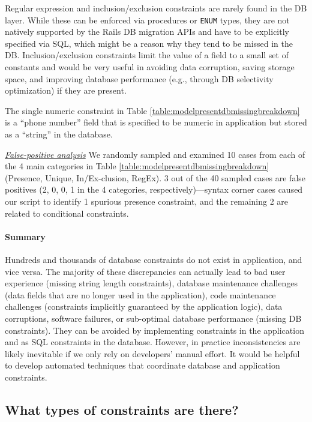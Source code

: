 Regular expression and inclusion/exclusion constraints are rarely found in the DB layer. While these can be enforced via procedures or {\tt ENUM} types, they are not natively supported by the Rails DB migration APIs and have to be explicitly specified via SQL, which might be a reason why they tend to be missed in the DB.
Inclusion/exclusion 
constraints limit the value of a field to a small set of
constants and would be very useful in avoiding data corruption, saving storage space, and improving database performance (e.g.,
through DB selectivity optimization) if they are present.

The single numeric constraint in Table \ref{table:modelpresentdbmissingbreakdown} is a ``phone number'' field that is
specified to be numeric in application but stored as a ``string'' in the database.

\underline{\it False-positive analysis}
 We randomly sampled
and examined 10 cases from each of the 4 main categories in Table \ref{table:modelpresentdbmissingbreakdown} (Presence, Unique,
In/Ex-clusion, RegEx).  
3 out of the 40 sampled cases are false positives 
(2, 0, 0, 1 in the 4 categories, respectively)---syntax corner cases caused our script to identify 1 spurious presence constraint, and the remaining 2 are related to conditional constraints.

\paragraph{\bf Summary} Hundreds and thousands of database constraints do not exist
in application, and vice versa. The majority of these discrepancies can actually
lead to bad user experience (missing string length constraints),   
database maintenance challenges (data fields that are no longer used in the application),
code maintenance challenges (constraints implicitly guaranteed by the application logic),
data corruptions, software failures, or sub-optimal database performance (missing DB constraints). They can be avoided by implementing constraints in the application and as SQL constraints in the database. However, in practice inconsistencies are likely inevitable if we only rely on developers' manual effort.
It would be helpful to develop automated techniques that coordinate
database and application constraints.

\subsection{What types of constraints are there?} 
